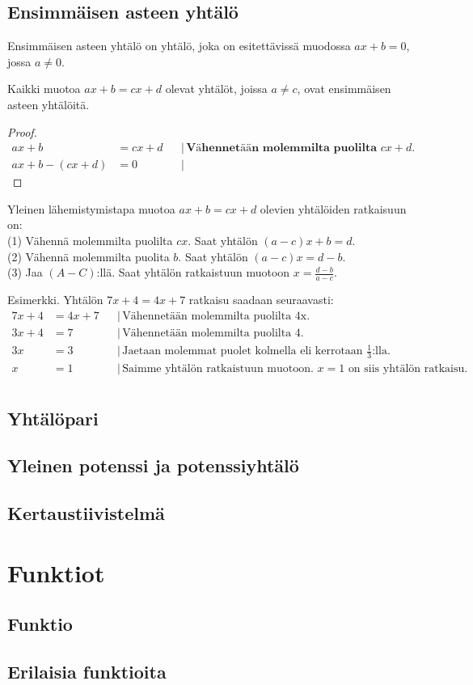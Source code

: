 \chapter{Ensimmäisen asteen yhtälö}
Ensimmäisen asteen yhtälö on yhtälö, joka on esitettävissä muodossa $ax+b=0$, jossa $a \neq 0$.

\begin{theorem}
Kaikki muotoa $ax+b=cx+d$ olevat yhtälöt, joissa $a \neq c$, ovat ensimmäisen asteen yhtälöitä.
\end{theorem}

\begin{proof}
\begin{align*}
ax+b &= cx+d & &| \, \textbf{Vähennetään molemmilta puolilta $cx+d$.} \\
ax+b - (cx+d) &= 0 & &|
\end{align*}
\end{proof}

\begin{theorem}
Yleinen lähemistymistapa muotoa $ax+b = cx+d$ olevien yhtälöiden ratkaisuun on: \\
(1) Vähennä molemmilta puolilta $cx$. Saat yhtälön $(a-c)x + b = d$. \\
(2) Vähennä molemmilta puolita $b$. Saat yhtälön $(a-c)x = d-b$. \\
(3) Jaa $(A-C)$:llä. Saat yhtälön ratkaistuun muotoon $x = \frac{d-b}{a-c}$.
\end{theorem}

Esimerkki. Yhtälön $7x+4=4x+7$ ratkaisu saadaan seuraavasti:
\begin{align*}
7x+4 &= 4x+7 & &| \, \text{Vähennetään molemmilta puolilta 4x.} \\
3x+4 &= 7 & &| \, \text{Vähennetään molemmilta puolilta 4.} \\
3x &= 3 & &| \, \text{Jaetaan molemmat puolet kolmella eli kerrotaan $\frac{1}{3}$:lla.} \\
x &= 1 & &| \, \text{Saimme yhtälön ratkaistuun muotoon. $x=1$ on siis yhtälön ratkaisu.} \\
\end{align*}

\chapter{Yhtälöpari}


\chapter{Yleinen potenssi ja potenssiyhtälö}
\chapter{Kertaustiivistelmä}

\part{Funktiot}
\chapter{Funktio}
\chapter{Erilaisia funktioita}